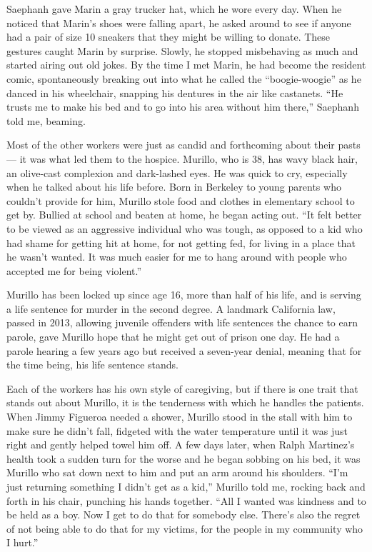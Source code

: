 Saephanh gave Marin a gray trucker hat, which he wore every day. When he
noticed that Marin's shoes were falling apart, he asked around to see if
anyone had a pair of size 10 sneakers that they might be willing to
donate. These gestures caught Marin by surprise. Slowly, he stopped
misbehaving as much and started airing out old jokes. By the time I met
Marin, he had become the resident comic, spontaneously breaking out into
what he called the ``boogie-woogie'' as he danced in his wheelchair,
snapping his dentures in the air like castanets. ``He trusts me to make
his bed and to go into his area without him there,'' Saephanh told me,
beaming.

Most of the other workers were just as candid and forthcoming about
their pasts --- it was what led them to the hospice. Murillo, who is 38,
has wavy black hair, an olive-cast complexion and dark-lashed eyes. He
was quick to cry, especially when he talked about his life before. Born
in Berkeley to young parents who couldn't provide for him, Murillo stole
food and clothes in elementary school to get by. Bullied at school and
beaten at home, he began acting out. ``It felt better to be viewed as an
aggressive individual who was tough, as opposed to a kid who had shame
for getting hit at home, for not getting fed, for living in a place that
he wasn't wanted. It was much easier for me to hang around with people
who accepted me for being violent.''

Murillo has been locked up since age 16, more than half of his life, and
is serving a life sentence for murder in the second degree. A landmark
California law, passed in 2013, allowing juvenile offenders with life
sentences the chance to earn parole, gave Murillo hope that he might get
out of prison one day. He had a parole hearing a few years ago but
received a seven-year denial, meaning that for the time being, his life
sentence stands.

Each of the workers has his own style of caregiving, but if there is one
trait that stands out about Murillo, it is the tenderness with which he
handles the patients. When Jimmy Figueroa needed a shower, Murillo stood
in the stall with him to make sure he didn't fall, fidgeted with the
water temperature until it was just right and gently helped towel him
off. A few days later, when Ralph Martinez's health took a sudden turn
for the worse and he began sobbing on his bed, it was Murillo who sat
down next to him and put an arm around his shoulders. ``I'm just
returning something I didn't get as a kid,'' Murillo told me, rocking
back and forth in his chair, punching his hands together. ``All I wanted
was kindness and to be held as a boy. Now I get to do that for somebody
else. There's also the regret of not being able to do that for my
victims, for the people in my community who I hurt.''

